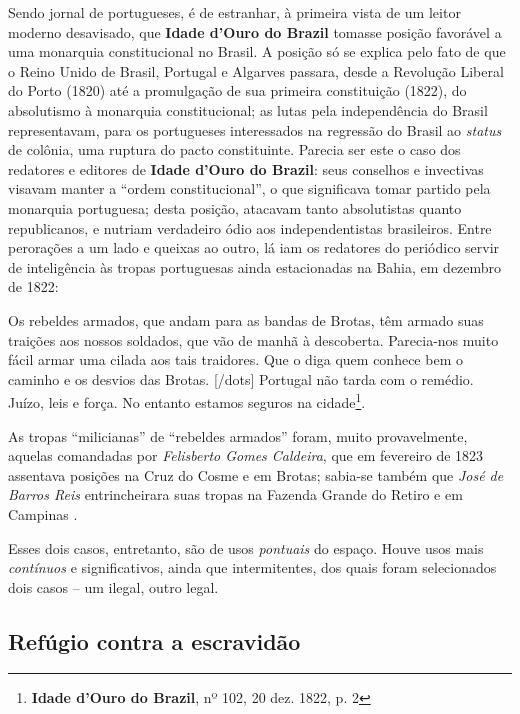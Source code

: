 Sendo jornal de portugueses, é de estranhar, à primeira vista de um leitor moderno desavisado, que \textbf{Idade d'Ouro do Brazil} tomasse posição favorável a uma monarquia constitucional no Brasil. A posição só se explica pelo fato de que o Reino Unido de Brasil, Portugal e Algarves passara, desde a Revolução Liberal do Porto (1820) até a promulgação de sua primeira constituição (1822), do absolutismo à monarquia constitucional; as lutas pela independência do Brasil representavam, para os portugueses interessados na regressão do Brasil ao \textit{status} de colônia, uma ruptura do pacto constituinte. Parecia ser este o caso dos redatores e editores de \textbf{Idade d'Ouro do Brazil}: seus conselhos e invectivas visavam manter a ``ordem constitucional'', o que significava tomar partido pela monarquia portuguesa; desta posição, atacavam tanto absolutistas quanto republicanos, e nutriam verdadeiro ódio aos independentistas brasileiros. Entre perorações a um lado e queixas ao outro, lá iam os redatores do periódico servir de inteligência às tropas portuguesas ainda estacionadas na Bahia, em dezembro de 1822:

\begin{citacao}
Os rebeldes armados, que andam para as bandas de Brotas, têm armado suas traições aos nossos soldados, que vão de manhã à descoberta. Parecia-nos muito fácil armar uma cilada aos tais traidores. Que o diga quem conhece bem o caminho e os desvios das Brotas. [/dots] Portugal não tarda com o remédio. Juízo, leis e força. No entanto estamos seguros na cidade\footnote{\textbf{Idade d'Ouro do Brazil}, nº 102, 20 dez. 1822, p. 2}.
\end{citacao}

As tropas ``milicianas'' de ``rebeldes armados'' foram, muito provavelmente, aquelas comandadas por \textit{Felisberto Gomes Caldeira}, que em fevereiro de 1823 assentava posições na Cruz do Cosme e em Brotas; sabia-se também que \textit{José de Barros Reis} entrincheirara suas tropas na Fazenda Grande do Retiro e em Campinas \cite[p.~248]{ruy_camara_1953}.

Esses dois casos, entretanto, são de usos \textit{pontuais} do espaço. Houve usos mais \textit{contínuos} e significativos, ainda que intermitentes, dos quais foram selecionados dois casos -- um ilegal, outro legal.

\subsection{Refúgio contra a escravidão}\label{subsec:refugioescrav}

